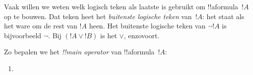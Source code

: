 \documentclass[openany]{memoir}
\begin{document}
\begingroup
\def\olfilename{OLP-0154}
\def\olfilepath{content/first-order-logic/syntax-and-semantics/}
\hypertarget{unit-OLP-0154}{}





\begin{explain}
Vaak willen we weten welk logisch teken als laatste is gebruikt om
!!a{formula}~$!A$ op te bouwen. Dat teken heet het \emph{buitenste
  logische teken} van~$!A$: het staat als het ware om de rest van
$!A$ heen. Het buitenste logische teken van $\lnot !A$ is bijvoorbeeld
$\lnot$. Bij $(!A \lor !B)$ is het $\lor$, enzovoort.
\end{explain}


\begin{defn}
Zo bepalen we het \emph{!!{main operator}} van !!a{formula}~$!A$:
\begin{enumerate}
\item {}







\end{enumerate}
\end{defn}
\end{document}
